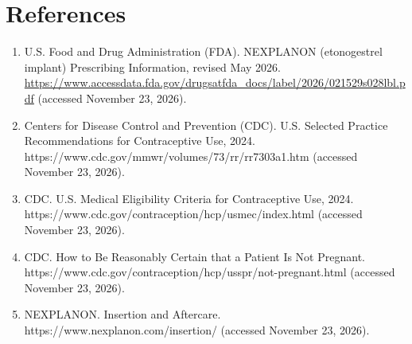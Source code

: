 \section*{References}
\begin{enumerate}
  \item U.S. Food and Drug Administration (FDA). NEXPLANON (etonogestrel implant) Prescribing Information, revised May 2026. \url{https://www.accessdata.fda.gov/drugsatfda_docs/label/2026/021529s028lbl.pdf} (accessed November 23, 2026).
  \item Centers for Disease Control and Prevention (CDC). U.S. Selected Practice Recommendations for Contraceptive Use, 2024. https://www.cdc.gov/mmwr/volumes/73/rr/rr7303a1.htm (accessed November 23, 2026).
  \item CDC. U.S. Medical Eligibility Criteria for Contraceptive Use, 2024. https://www.cdc.gov/contraception/hcp/usmec/index.html (accessed November 23, 2026).
  \item CDC. How to Be Reasonably Certain that a Patient Is Not Pregnant. https://www.cdc.gov/contraception/hcp/usspr/not-pregnant.html (accessed November 23, 2026).
  \item NEXPLANON. Insertion and Aftercare. https://www.nexplanon.com/insertion/ (accessed November 23, 2026).
\end{enumerate}
\clearpage
